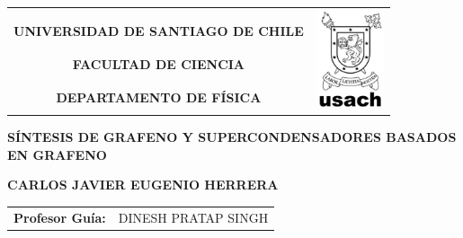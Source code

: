 \documentclass[12pt]{book}
\begin{document}
\renewcommand{\contentsname}{Tabla de contenidos}	%
\renewcommand{\listfigurename}{Índice de Ilustraciones}	%
\renewcommand{\indexname}{Índice analítico}		%
\renewcommand{\listtablename}{Índice de tablas}
\renewcommand{\tablename}{Tabla}


\begin{titlepage}
  \begin{flushright}
    \begin{tabular}{cl}
      &\multirow{4}{*}{\hspace{0cm}\includegraphics[width=2cm]{logoBN.png}}\\
      \large{\textbf{UNIVERSIDAD DE SANTIAGO DE CHILE}}&  \\
      \textbf{FACULTAD DE CIENCIA}&\\
      \textbf{DEPARTAMENTO DE FÍSICA}& \\
    \end{tabular}
  \end{flushright}

\vspace*{3cm}

  \begin{center}
    \large{\textbf{SÍNTESIS DE GRAFENO Y SUPERCONDENSADORES BASADOS EN GRAFENO}}\\ %
  \end{center}
  \begin{center}
    \textbf{CARLOS JAVIER EUGENIO HERRERA}
  \end{center}

\vspace*{1cm}

  \begin{flushright}
    \begin{tabular}{ll}
      \textbf{Profesor Guía:}& DINESH PRATAP SINGH\\
    \end{tabular}
\\\vspace{3cm}


\end{flushright}
\end{titlepage}
\end{document}
